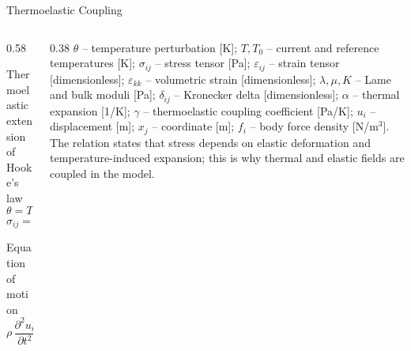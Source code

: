 \documentclass[aspectratio=169,10pt]{beamer}
\begin{document}
\begin{frame}{Thermoelastic Coupling}
  \begin{columns}[T]
    \begin{column}{0.58\textwidth}
      \begin{block}{Thermoelastic extension of Hooke's law}
        \[
          \theta = T - T_0
        \]
        \[
          \sigma_{ij} = \lambda\,\delta_{ij}\,\varepsilon_{kk}
          + 2\mu\,\varepsilon_{ij}
          - \gamma\,\delta_{ij}\,\theta,
          \qquad
          \gamma = 3K\alpha
        \]
      \end{block}
      \begin{block}{Equation of motion}
        \[
          \rho\,\frac{\partial^2u_i}{\partial t^2}
          = \frac{\partial \sigma_{ij}}{\partial x_j} + f_i
        \]
      \end{block}
    \end{column}
    \begin{column}{0.38\textwidth}
      \scriptsize
      $\theta$ -- temperature perturbation [K]; $T,T_0$ -- current and
      reference temperatures [K]; $\sigma_{ij}$ -- stress tensor [Pa];
      $\varepsilon_{ij}$ -- strain tensor [dimensionless];
      $\varepsilon_{kk}$ -- volumetric strain [dimensionless];
      $\lambda,\mu,K$ -- Lame and bulk moduli [Pa];
      $\delta_{ij}$ -- Kronecker delta [dimensionless];
      $\alpha$ -- thermal expansion [1/K]; $\gamma$ -- thermoelastic
      coupling coefficient [Pa/K]; $u_i$ -- displacement [m];
      $x_j$ -- coordinate [m]; $f_i$ -- body force density [N/m$^3$].
      \vskip 4pt
      The relation states that stress depends on elastic deformation and
      temperature-induced expansion; this is why thermal and elastic fields
      are coupled in the model.
    \end{column}
  \end{columns}
\end{frame}
\end{document}
